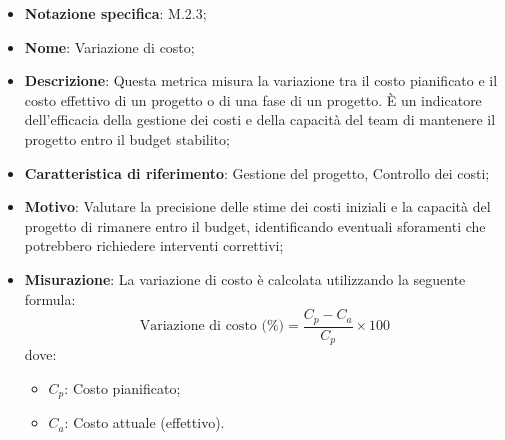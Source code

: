 \begin{itemize}
    \item \textbf{Notazione specifica}: M.2.3;
    \item \textbf{Nome}: Variazione di costo;
    \item \textbf{Descrizione}: Questa metrica misura la variazione tra il costo pianificato e il costo effettivo di un progetto o di una fase di un progetto. È un indicatore dell'efficacia della gestione dei costi e della capacità del team di mantenere il progetto entro il budget stabilito;
    \item \textbf{Caratteristica di riferimento}: Gestione del progetto, Controllo dei costi;
    \item \textbf{Motivo}: Valutare la precisione delle stime dei costi iniziali e la capacità del progetto di rimanere entro il budget, identificando eventuali sforamenti che potrebbero richiedere interventi correttivi;
    \item \textbf{Misurazione}: La variazione di costo è calcolata utilizzando la seguente formula:
    \[
        \text{Variazione di costo (\%)} =\frac{C_p - C_a}{C_p} \times 100
    \]
    dove:
    \begin{itemize}
        \item $C_{p}$: Costo pianificato;
        \item $C_{a}$: Costo attuale (effettivo).
    \end{itemize}
\end{itemize}
